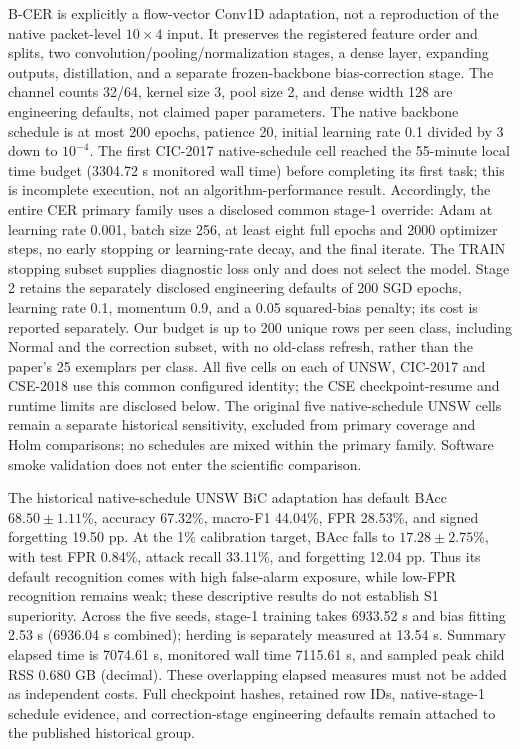 \documentclass[10pt,twocolumn]{article}
\begin{document}
B-CER is explicitly a flow-vector Conv1D adaptation, not a reproduction of the native packet-level $10\times4$ input. It preserves the registered feature order and splits, two convolution/pooling/normalization stages, a dense layer, expanding outputs, distillation, and a separate frozen-backbone bias-correction stage. The channel counts 32/64, kernel size 3, pool size 2, and dense width 128 are engineering defaults, not claimed paper parameters. The native backbone schedule is at most 200 epochs, patience 20, initial learning rate 0.1 divided by 3 down to $10^{-4}$. The first CIC-2017 native-schedule cell reached the 55-minute local time budget (3304.72 s monitored wall time) before completing its first task; this is incomplete execution, not an algorithm-performance result. Accordingly, the entire CER primary family uses a disclosed common stage-1 override: Adam at learning rate 0.001, batch size 256, at least eight full epochs and 2000 optimizer steps, no early stopping or learning-rate decay, and the final iterate. The TRAIN stopping subset supplies diagnostic loss only and does not select the model. Stage 2 retains the separately disclosed engineering defaults of 200 SGD epochs, learning rate 0.1, momentum 0.9, and a 0.05 squared-bias penalty; its cost is reported separately. Our budget is up to 200 unique rows per seen class, including Normal and the correction subset, with no old-class refresh, rather than the paper's 25 exemplars per class. All five cells on each of UNSW, CIC-2017 and CSE-2018 use this common configured identity; the CSE checkpoint-resume and runtime limits are disclosed below. The original five native-schedule UNSW cells remain a separate historical sensitivity, excluded from primary coverage and Holm comparisons; no schedules are mixed within the primary family. Software smoke validation does not enter the scientific comparison.

The historical native-schedule UNSW BiC adaptation has default BAcc $68.50\pm1.11$\%, accuracy 67.32\%, macro-F1 44.04\%, FPR 28.53\%, and signed forgetting 19.50 pp. At the 1\% calibration target, BAcc falls to $17.28\pm2.75$\%, with test FPR 0.84\%, attack recall 33.11\%, and forgetting 12.04 pp. Thus its default recognition comes with high false-alarm exposure, while low-FPR recognition remains weak; these descriptive results do not establish S1 superiority. Across the five seeds, stage-1 training takes 6933.52 s and bias fitting 2.53 s (6936.04 s combined); herding is separately measured at 13.54 s. Summary elapsed time is 7074.61 s, monitored wall time 7115.61 s, and sampled peak child RSS 0.680 GB (decimal). These overlapping elapsed measures must not be added as independent costs. Full checkpoint hashes, retained row IDs, native-stage-1 schedule evidence, and correction-stage engineering defaults remain attached to the published historical group.
\end{document}
